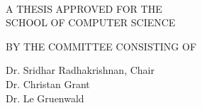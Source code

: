 \thispagestyle{empty}
\begin{center}
\MakeUppercase{\mytitle{}} \\

\vspace{1.0in}

A THESIS APPROVED FOR THE \\
SCHOOL OF COMPUTER SCIENCE \\

\vspace{2.0in}

BY THE COMMITTEE CONSISTING OF \\
\end{center}

\begin{flushright}
Dr. Sridhar Radhakrishnan, Chair \\
Dr. Christan Grant \\
Dr. Le Gruenwald \\

\end{flushright}

\pagebreak
